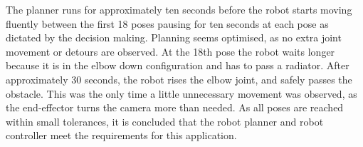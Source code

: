 The planner runs for approximately ten seconds before the robot starts moving fluently between the first 18 poses pausing for ten seconds at each pose as dictated by the decision making. Planning seems optimised, as no extra joint movement or detours are observed. At the 18th pose the robot waits longer because it is in the elbow down configuration and has to pass a radiator. After approximately 30 seconds, the robot rises the elbow joint, and safely passes the obstacle. This was the only time a little unnecessary movement was observed, as the end-effector turns the camera more than needed. As all poses are reached within small tolerances, it is concluded that the robot planner and robot controller meet the requirements for this application.